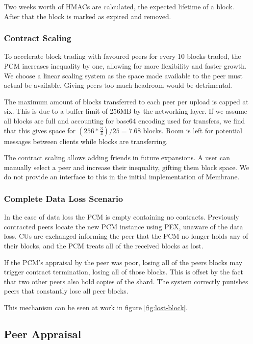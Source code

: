 \documentclass[11pt, a4paper, twocolumn, twoside]{report}
\begin{document}
Two weeks worth of HMACs are calculated, the expected lifetime of a block. After that the block is marked as expired and removed.

\subsubsection{Contract Scaling}

To accelerate block trading with favoured peers for every 10 blocks traded, the PCM increases inequality by one, allowing for more flexibility and faster growth. We choose a linear scaling system as the space made available to the peer must actual be available. Giving peers too much headroom would be detrimental. 

The maximum amount of blocks transferred to each peer per upload is capped at six. This is due to a buffer limit of 256MB by the networking layer. If we assume all blocks are full and accounting for base64 encoding used for transfers, we find that this gives space for $(256 * \frac{3}{4}) / 25 = 7.68$ blocks. Room is left for potential messages between clients while blocks are transferring.

The contract scaling allows adding friends in future expansions. A user can manually select a peer and increase their inequality, gifting them block space. We do not provide an interface to this in the initial implementation of Membrane.

\subsubsection{Complete Data Loss Scenario}

In the case of data loss the PCM is empty containing no contracts. Previously contracted peers locate the new PCM instance using PEX, unaware of the data loss. CUs are exchanged informing the peer that the PCM no longer holds any of their blocks, and the PCM treats all of the received blocks as lost.

If the PCM's appraisal by the peer was poor, losing all of the peers blocks may trigger contract termination, losing all of those blocks. This is offset by the fact that two other peers also hold copies of the shard. The system correctly punishes peers that constantly lose all peer blocks.

This mechanism can be seen at work in figure \ref{fig:lost-block}.

\subsection{Peer Appraisal} \label{sec:peerAppraisal}
\end{document}
